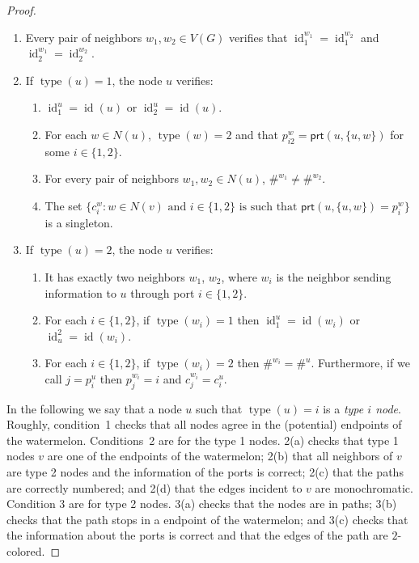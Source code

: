 \documentclass[11pt]{article}
\DeclareMathOperator{\id}{id}
\DeclareMathOperator{\type}{type}
\newcommand*{\ports}{\mathsf{prt}}
\begin{document}
\begin{proof}
\begin{enumerate}
    \item Every pair of neighbors \( w_1, w_2 \in V(G) \) verifies that \( \id^{w_1}_1 = \id^{w_2}_1 \) and \( \id^{w_1}_2 = \id^{w_2}_2 \). 
    \item If \( \type(u) = 1 \), the node \( u \) verifies:
    \begin{enumerate}
        \item \( \id^u_1 = \id(u) \) or \( \id^u_2 = \id(u)\).
        \item For each \( w \in N(u) \), \( \type(w) = 2 \) and that $p^w_{i2} = \ports(u,\{u,w\})$ for some $i\in \{1,2\}$.
        \item For every pair of neighbors \( w_1, w_2 \in N(u) \), \( \#^{w_1} \neq \#^{w_2} \).
        \item The set $\{c_i^w: w\in N(v) \text{ and } i\in \{1,2\} \text{ is such that }\ports(u,\{u,w\}) = p^w_{i} \}$ is a singleton. 
    \end{enumerate}
    \item If \( \type(u) = 2 \), the node \( u \) verifies:
    \begin{enumerate}

    
        \item It has exactly two neighbors $w_1$, $w_2$, where $w_i$ is the neighbor sending information to $u$ through port $i \in \{1,2\}$. 
      
            \item For each $i \in \{1,2\}$, if $\type(w_i) = 1$ then $\id_1^u = \id(w_i)$ or $\id^2_u = \id(w_i)$. 
            \item For each $i \in \{1,2\}$, if $\type(w_i) = 2$ then $\#^{w_i} = \#^u$. Furthermore, if  we call $j = p^u_{i}$ then $p_j^{w_i} = i$ and $c_j^{w_i} = c_i^u$.
    \end{enumerate}
\end{enumerate}

In the following we say that a node $u$ such that \( \type(u) = i \) is a \emph{type \( i \) node}. Roughly, condition~1 checks that all nodes agree in the (potential) endpoints of the watermelon. Conditions~2 are for the type 1 nodes. 2(a) checks that type 1 nodes $v$ are one of the endpoints of the watermelon; 2(b) that all neighbors of $v$ are type 2 nodes and the information of the ports is correct; 2(c) that the paths are correctly numbered; and 2(d) that the edges incident to $v$ are monochromatic. Condition 3 are for type 2 nodes. 3(a) checks that the nodes are in paths; 3(b) checks that the path stops in a endpoint of the watermelon; and 3(c) checks that the information about the ports is correct and that the edges of the path are $2$-colored. 


\end{proof}
\end{document}
